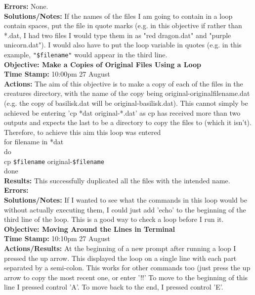 \documentclass{article}
\begin{document}
\begin{FlushLeft}
\textbf{Errors:} None. \\
\textbf{Solutions/Notes:} If the names of the files I am going to contain in a loop contain spaces, put the file in quote marks (e.g. in this objective if rather than *.dat, I had two files I would type them in as "red dragon.dat" and "purple unicorn.dat"). I would also have to put the loop variable in quotes (e.g. in this example, \verb|"$filename"| would appear in the third line.\\
\vspace{5mm}
\textbf{Objective: Make a Copies of Original Files Using a Loop}\\ 
\textbf{Time Stamp:} 10:00pm  27 August\\
\textbf{Actions:} The aim of this objective is to make a copy of each of the files in the creatures directory, with the name of the copy being original-originalfilename.dat (e.g. the copy of basilisk.dat will be original-basilisk.dat). This cannot simply be achieved be entering 'cp *dat original-*.dat' as cp has received more than two outputs and expects the last to be a directory to copy the files to (which it isn't). Therefore, to achieve this aim this loop was entered\\
for filename in *dat\\
do\\
cp \verb|$filename| original-\verb|$filename|\\
done\\
\textbf{Results:} This successfully duplicated all the files with the intended name.\\
\textbf{Errors:} \\
\textbf{Solutions/Notes:} If I wanted to see what the commands in this loop would be without actually executing them, I could just add 'echo' to the beginning of the third line of the loop. This is a good way to check a loop before I run it.\\
\vspace{5mm}
\textbf{Objective: Moving Around the Lines in Terminal}\\ 
\textbf{Time Stamp:} 10:10pm  27 August\\
\textbf{Actions/Results:} At the beginning of a new prompt after running a loop I pressed the up arrow. This displayed the loop on a single line with each part separated by a semi-colon. This works for other commands too (just press the up arrow to copy the most recent one, or enter '!!' To move to the beginning of this line I pressed control 'A'. To move back to the end, I pressed control 'E'. \\

\end{FlushLeft}
\end{document}
